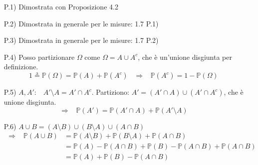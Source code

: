 \begin{dimostrazione}
    \begin{itemize}
        \item [P.1)] Dimostrata con Proposizione 4.2
        \item [P.2)] Dimostrata in generale per le misure: 1.7 P.1)
        \item [P.3)] Dimostrata in generale per le misure: 1.7 P.2)
        \item [P.4)] Posso partizionare $\Omega$ come $\Omega = A\cup A^c$, che è un'unione disgiunta per definizione.
        \[1\overset{\text{a}}{=}\mathbb{P}(\Omega) = \mathbb{P}(A)+\mathbb{P}(A^c) \;\;\; \Rightarrow \;\;\;\mathbb{P}(A^c) = 1-\mathbb{P}(\Omega)\]
        \item [P.5)] $A, A': \;\;\; A'\setminus A = A' \cap A^c$. Partiziono: $A' = (A'\cap A)\cup (A'\cap A^c)$, che è unione disgiunta.
        \[\Rightarrow\;\;\; \mathbb{P}(A') = \mathbb{P}(A'\cap A) + \mathbb{P}(A'\setminus A)\]
        
        \item [P.6)] \(A\cup B = (A \setminus B)\cup(B\setminus A)\cup (A\cap B)\)
        \begin{align*}
            \Rightarrow\;\;\; \mathbb{P}(A \cup B) &= \mathbb{P}(A \setminus B) + \mathbb{P}(B\setminus A) +\mathbb{P}(A\cap B) \\ &= \mathbb{P}(A) -\mathbb{P}(A\cap B) + \mathbb{P}(B) - \mathbb{P}(A \cap B) + \mathbb{P}(A \cap B)\\ & = \mathbb{P}(A) + \mathbb{P}(B)-\mathbb{P}(A\cap B)
        \end{align*}
        

\end{itemize}
\end{dimostrazione}
